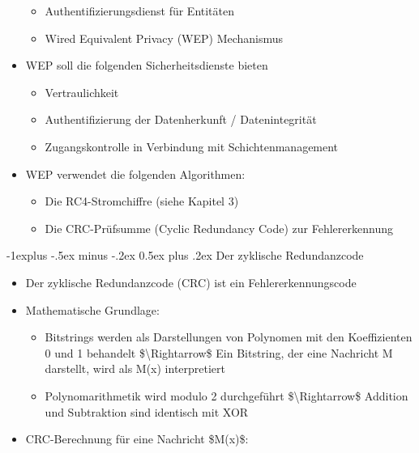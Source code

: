 \documentclass[a4paper]{article}
\makeatletter
\renewcommand{\subsection}{\@startsection{subsection}{2}{0mm}%
 {-1explus -.5ex minus -.2ex}%
 {0.5ex plus .2ex}%
 {\normalfont\normalsize\bfseries}}
\makeatother
\begin{document}
\begin{multicols}{3}
\begin{itemize}
              \begin{itemize}
                  \item
                        Authentifizierungsdienst für Entitäten
                  \item
                        Wired Equivalent Privacy (WEP) Mechanismus
              \end{itemize}
        \item
              WEP soll die folgenden Sicherheitsdienste bieten

              \begin{itemize}
                  \item
                        Vertraulichkeit
                  \item
                        Authentifizierung der Datenherkunft / Datenintegrität
                  \item
                        Zugangskontrolle in Verbindung mit Schichtenmanagement
              \end{itemize}
        \item
              WEP verwendet die folgenden Algorithmen:

              \begin{itemize}
                  \item
                        Die RC4-Stromchiffre (siehe Kapitel 3)
                  \item
                        Die CRC-Prüfsumme (Cyclic Redundancy Code) zur Fehlererkennung
              \end{itemize}
    \end{itemize}


    \subsection{Der zyklische
        Redundanzcode}

    \begin{itemize}
        \item
              Der zyklische Redundanzcode (CRC) ist ein Fehlererkennungscode
        \item
              Mathematische Grundlage:

              \begin{itemize}
                  \item
                        Bitstrings werden als Darstellungen von Polynomen mit den
                        Koeffizienten 0 und 1 behandelt \$\textbackslash Rightarrow\$ Ein
                        Bitstring, der eine Nachricht M darstellt, wird als M(x)
                        interpretiert
                  \item
                        Polynomarithmetik wird modulo 2 durchgeführt
                        \$\textbackslash Rightarrow\$ Addition und Subtraktion sind
                        identisch mit XOR
              \end{itemize}
        \item
              CRC-Berechnung für eine Nachricht \$M(x)\$:


\end{itemize}
\end{multicols}
\end{document}
